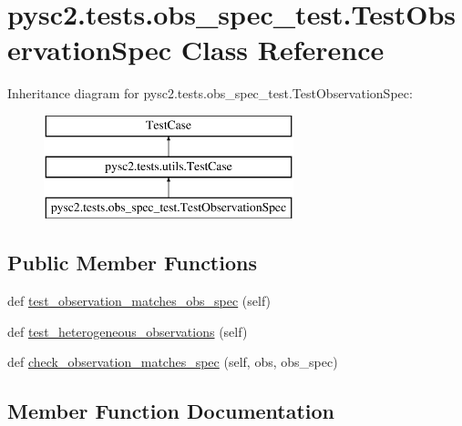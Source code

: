 \hypertarget{classpysc2_1_1tests_1_1obs__spec__test_1_1_test_observation_spec}{}\section{pysc2.\+tests.\+obs\+\_\+spec\+\_\+test.\+Test\+Observation\+Spec Class Reference}
\label{classpysc2_1_1tests_1_1obs__spec__test_1_1_test_observation_spec}
Inheritance diagram for pysc2.\+tests.\+obs\+\_\+spec\+\_\+test.\+Test\+Observation\+Spec\+:\begin{figure}[H]
\begin{center}
\leavevmode
\includegraphics[height=3.000000cm]{classpysc2_1_1tests_1_1obs__spec__test_1_1_test_observation_spec}
\end{center}
\end{figure}
\subsection*{Public Member Functions}
\begin{DoxyCompactItemize}
\item 
def \mbox{\hyperlink{classpysc2_1_1tests_1_1obs__spec__test_1_1_test_observation_spec_afa14b2bb7166ba3358039b7dc400418a}{test\+\_\+observation\+\_\+matches\+\_\+obs\+\_\+spec}} (self)
\item 
def \mbox{\hyperlink{classpysc2_1_1tests_1_1obs__spec__test_1_1_test_observation_spec_ab63ceea5ffafcd8abec8a4e594639190}{test\+\_\+heterogeneous\+\_\+observations}} (self)
\item 
def \mbox{\hyperlink{classpysc2_1_1tests_1_1obs__spec__test_1_1_test_observation_spec_a95f3fcbae5cb9fa6b6a7dd4ab1474a65}{check\+\_\+observation\+\_\+matches\+\_\+spec}} (self, obs, obs\+\_\+spec)
\end{DoxyCompactItemize}


\subsection{Member Function Documentation}
\mbox{\label{classpysc2_1_1tests_1_1obs__spec__test_1_1_test_observation_spec_a95f3fcbae5cb9fa6b6a7dd4ab1474a65}} 
